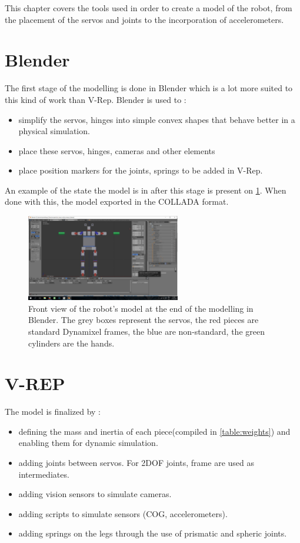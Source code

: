 This chapter covers the tools used in order to create a model of the robot, from the placement of the servos and joints to the incorporation of accelerometers.

\section{Blender}
The first stage of the modelling is done in Blender which is a lot more suited to this kind of work than V-Rep. 
Blender is used to :
\begin{itemize}
\item simplify the servos, hinges into simple convex shapes that behave better in a physical simulation.
\item place these servos, hinges, cameras and other elements
\item place position markers for the joints, springs to be added in V-Rep.
\end{itemize}
An example of the state the model is in after this stage is present on \cref{fig:modelling_blender}. When done with this, the model exported in the COLLADA format.

\begin{figure}[htp]
\center
\includegraphics[width=0.6\textwidth]{figures/modelling_blender}
\caption[Front view of the robot's model at the end of the modelling in Blender]{Front view of the robot's model at the end of the modelling in Blender. The grey boxes represent the servos, the red pieces are standard Dynamixel frames, the blue are non-standard, the green cylinders are the hands.}
\label{fig:modelling_blender}
\end{figure}

\section{V-REP}
The model is finalized by :
\begin{itemize}
\item defining the mass and inertia of each piece(compiled in \cref{table:weights}) and enabling them for dynamic simulation.
\item adding joints between servos. For 2DOF joints, frame are used as intermediates.
\item adding vision sensors to simulate cameras.
\item adding scripts to simulate sensors (COG, accelerometers).
\item adding springs on the legs through the use of prismatic and spheric joints.
\end{itemize}

